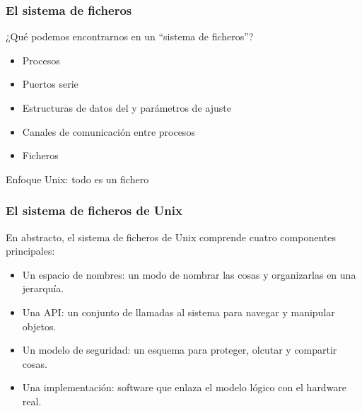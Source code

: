\documentclass{beamer}
\begin{document}
\begin{frame}
  \frametitle{El sistema de ficheros}

¿Qué podemos encontrarnos en un ``sistema de ficheros''?

\pause

\begin{itemize}
\item Procesos

\pause

\item Puertos serie

\pause

\item Estructuras de datos del y parámetros de ajuste

\pause

\item Canales de comunicación entre procesos 

\pause

\item Ficheros


\end{itemize}

\pause

\begin{center}
\alert{Enfoque Unix: todo es un fichero}
\end{center}

\end{frame}

\begin{frame}
  \frametitle{El sistema de ficheros de Unix}

En abstracto, el sistema de ficheros de Unix comprende cuatro componentes principales:

  \begin{itemize}
    \item Un \alert{espacio de nombres}: un modo de nombrar las cosas y organizarlas en una jerarquía.
    \item Una \alert{API}: un conjunto de llamadas al sistema para navegar y manipular objetos.
    \item Un \alert{modelo de seguridad}: un esquema para proteger, olcutar y compartir cosas.
    \item Una \alert{implementación}: software que enlaza el modelo lógico con el hardware real.
  \end{itemize}
\end{frame}
\end{document}
